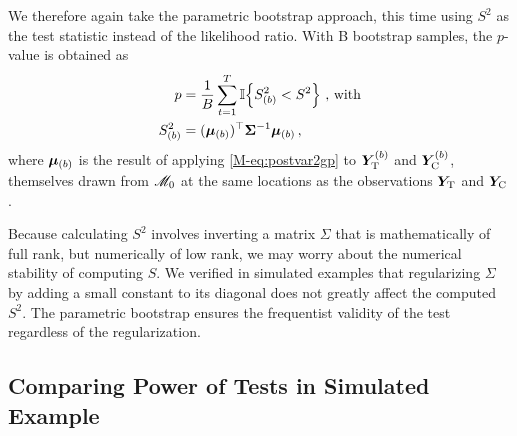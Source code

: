 \documentclass[letter,12pt]{article}
\begin{document}
We therefore again take the parametric bootstrap approach, this time using \(S^2\) as the test statistic instead of the likelihood ratio.
With B bootstrap samples, the \(p\)-value is obtained as
\begin{equation}
    \begin{split}
        p &= \frac{1}{B} \sum_{t=1}^T \Ind\cbr{S_{(b)}^2 < S^2}\  \text{, with}\\
        S_{(b)}^2 &= (\muvec_{(b)} )\trans \SigmaMat^{-1} \muvec_{(b)}\,,
    \end{split}
\end{equation}
where \(\bm{\mu}_{(b)}\) is the result of applying \autoref*{M-eq:postvar2gp} to \(\bm{Y}_{\mathrm{T}}^{(b)}\) and \(\bm{Y}_{\mathrm{C}}^{(b)}\), themselves drawn from \(\mathscr{M}_0\) at the same locations as the observations \(\bm{Y}_{\mathrm{T}}\) and \(\bm{Y}_{\mathrm{C}}\).

Because calculating \(S^2\) involves inverting a matrix \(\Sigma\) that is mathematically of full rank, but numerically of low rank, we may worry about the numerical stability of computing \(S\).
We verified in simulated examples that regularizing \(\Sigma\) by adding a small constant to its diagonal does not greatly affect the computed \(S^2\).
The parametric bootstrap ensures the frequentist validity of the test
regardless of the regularization.


\subsection{Comparing Power of Tests in Simulated Example}
\label{sec:powersim}
\end{document}
